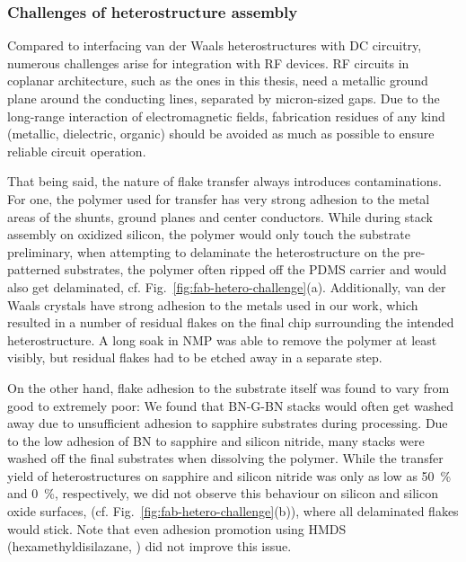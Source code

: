 \subsubsection{Challenges of heterostructure assembly}

Compared to interfacing van der Waals heterostructures with DC circuitry, numerous challenges arise for integration with RF devices.
%
RF circuits in coplanar architecture, such as the ones in this thesis, need a metallic ground plane around the conducting lines, separated by micron-sized gaps.
%
Due to the long-range interaction of electromagnetic fields, fabrication residues of any kind (metallic, dielectric, organic) should be avoided as much as possible to ensure reliable circuit operation.


That being said, the nature of flake transfer always introduces contaminations.
%
For one, the polymer used for transfer has very strong adhesion to the metal areas of the shunts, ground planes and center conductors.
%
While during stack assembly on oxidized silicon, the polymer would only touch the substrate preliminary, when attempting to delaminate the heterostructure on the pre-patterned substrates, the polymer often ripped off the PDMS carrier and would also get delaminated, cf. Fig.~\ref{fig:fab-hetero-challenge}(a).
%
Additionally, van der Waals crystals have strong adhesion to the metals used in our work, which resulted in a number of residual flakes on the final chip surrounding the intended heterostructure.
%
A long soak in NMP was able to remove the polymer at least visibly, but residual flakes had to be etched away in a separate step.


On the other hand, flake adhesion to the substrate itself was found to vary from good to extremely poor:
%
We found that BN-G-BN stacks would often get washed away due to unsufficient adhesion to sapphire substrates during processing.
%
Due to the low adhesion of BN to sapphire and silicon nitride, many stacks were washed off the final substrates when dissolving the polymer.
%
While the transfer yield of heterostructures on sapphire and silicon nitride was only as low as \SI{50}{\percent} and \SI{0}{\percent}, respectively, we did not observe this behaviour on silicon and silicon oxide surfaces, (cf. Fig.~\ref{fig:fab-hetero-challenge}(b)), where all delaminated flakes would stick.
%
Note that even adhesion promotion using HMDS (hexamethyldisilazane, ) did not improve this issue.


